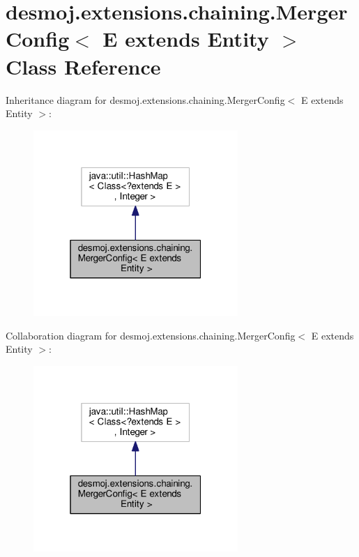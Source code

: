 \section{desmoj.\-extensions.\-chaining.\-Merger\-Config$<$ E extends Entity $>$ Class Reference}
\label{classdesmoj_1_1extensions_1_1chaining_1_1_merger_config_3_01_e_01extends_01_entity_01_4}


Inheritance diagram for desmoj.\-extensions.\-chaining.\-Merger\-Config$<$ E extends Entity $>$\-:
\nopagebreak
\begin{figure}[H]
\begin{center}
\leavevmode
\includegraphics[width=220pt]{classdesmoj_1_1extensions_1_1chaining_1_1_merger_config_3_01_e_01extends_01_entity_01_4__inherit__graph}
\end{center}
\end{figure}


Collaboration diagram for desmoj.\-extensions.\-chaining.\-Merger\-Config$<$ E extends Entity $>$\-:
\nopagebreak
\begin{figure}[H]
\begin{center}
\leavevmode
\includegraphics[width=220pt]{classdesmoj_1_1extensions_1_1chaining_1_1_merger_config_3_01_e_01extends_01_entity_01_4__coll__graph}
\end{center}
\end{figure}
